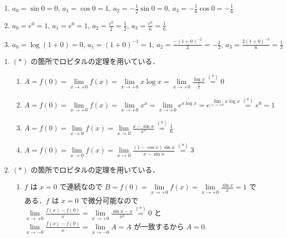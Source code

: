 \documentclass[11pt, uplatex, dvipdfmx, twoside]{jsarticle}
\renewcommand{\dlim}{\lim\limits} %
\begin{document}
\begin{enumerate}[label=\ref{sec:derivative}.\arabic*]
\begin{enumerate}[label=(\arabic*)]
  \item
    $a_0 = \sin 0 =0, \, a_1 = \cos 0 = 1, \, a_2 = -\frac{1}{2}\sin 0 =0, \, a_3 =
    -\frac{1}{6}\cos 0 = -\frac{1}{6}$

  \item
    $a_0 = e^0=1, \, a_1=e^0=1, \, a_2= \frac{e^0}{2}=\frac{1}{2}, \,
    a_3=\frac{e^0}{6}=\frac{1}{6}$

  \item
    $a_0=\log (1+0) =0, \, a_1 = (1+0)^{-1} = 1, \, a_2 = \frac{-(1+0)^{-2}}{2}=
    -\frac{1}{2}, \, a_3 = \frac{2(1+0)^{-3}}{6} = \frac{1}{3}$
  \end{enumerate}

\end{enumerate}

\begin{enumerate}[label=\ref{sec:hospital}.\arabic*]
  \setlength{\itemsep}{1ex}
  
\item $(\ast)$ の箇所でロピタルの定理を用いている．
  \begin{enumerate}[label=(\arabic*)]
    \setlength{\itemsep}{1ex}
    
  \item
    $A = f(0) = \dlim_{x \to +0} f(x) = \dlim_{x \to +0} x \log x =
    \dlim_{x \to +0} \frac{\log x}{\frac{1}{x}} \overset{(\ast)}{=} 0$

  \item
    $A = f(0) = \dlim_{x \to +0} f(x) = \dlim_{x \to +0} x^x =
    \dlim_{x \to +0} e^{x \log x} = e^{\dlim_{x \to +0} x \log x} \overset{(\ast)}{=} e^0=1$ 

  \item
    $A= f(0) = \dlim_{x \to 0}f(x) = \dlim_{x \to 0} \frac{x-\sin
      x}{x^3} \overset{(\ast)}{=}\frac{1}{6}$

  \item
    $A=f(0) = \dlim_{x \to 0} f(x) = \dlim_{x \to 0} \frac{(1-\cos
      x)\sin x}{x-\sin x} \overset{(\ast)}{=} 3$
    
  \end{enumerate}

\item $(\ast)$ の箇所でロピタルの定理を用いている．
  \begin{enumerate}[label=(\arabic*)]
    \setlength{\itemsep}{1ex}
    
  \item $f$ は $x=0$ で連続なので
    $B=f(0) = \dlim_{x \to +0} f(x) = \dlim_{x \to +0}\frac{\sin x}{x}
    = 1$ である．$f$ は $x=0$ で微分可能なので
    $\dlim_{x \to +0} \frac{f(x)-f(0)}{x} = \dlim_{x \to +0}
    \frac{\sin x - x}{x^2} \overset{(\ast)}{=}  0$ と $\dlim_{x \to -0}
    \frac{f(x)-f(0)}{x} = \dlim_{x \to -0} A = A$ が一致するから $A=0$.
    

\end{enumerate}
\end{enumerate}
\end{document}
